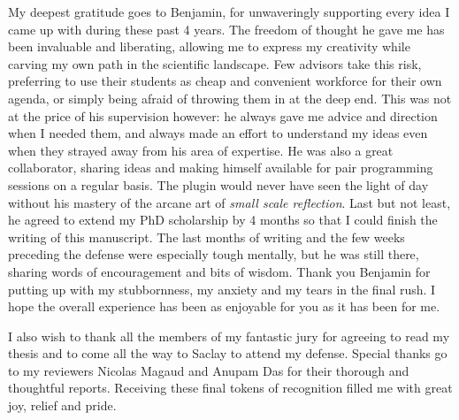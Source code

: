 My deepest gratitude goes to Benjamin, for unwaveringly supporting every idea I came up with during these past 4 years. The freedom of thought he gave me has been invaluable and liberating, allowing me to express my creativity while carving my own path in the scientific landscape. Few advisors take this risk, preferring to use their students as cheap and convenient workforce for their own agenda, or simply being afraid of throwing them in at the deep end. This was not at the price of his supervision however: he always gave me advice and direction when I needed them, and always made an effort to understand my ideas even when they strayed away from his area of expertise. He was also a great collaborator, sharing ideas and making himself available for pair programming sessions on a regular basis. The  plugin would never have seen the light of day without his mastery of the arcane art of \emph{small scale reflection}. Last but not least, he agreed to extend my PhD scholarship by 4 months so that I could finish the writing of this manuscript. The last months of writing and the few weeks preceding the defense were especially tough mentally, but he was still there, sharing words of encouragement and bits of wisdom. Thank you Benjamin for putting up with my stubbornness, my anxiety and my tears in the final rush. I hope the overall experience has been as enjoyable for you as it has been for me.

I also wish to thank all the members of my fantastic jury for agreeing to read my thesis and to come all the way to Saclay to attend my defense. Special thanks go to my reviewers Nicolas Magaud and Anupam Das for their thorough and thoughtful reports. Receiving these final tokens of recognition filled me with great joy, relief and pride.

